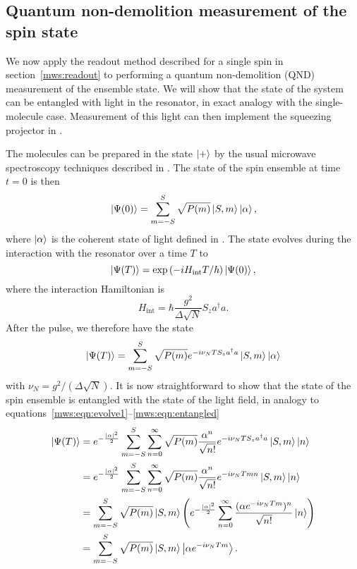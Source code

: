 \subsection{Quantum non-demolition measurement of the spin state}

We now apply the readout method described for a single spin in
section~\ref{mws:readout} to performing a quantum non-demolition (QND)
measurement of the ensemble state.
%
We will show that the state of the system can be entangled with light in the
resonator, in exact analogy with the single-molecule case. Measurement of this
light can then implement the squeezing projector in
.

The molecules can be prepared in the state $\ket{+}$ by the usual microwave
spectroscopy techniques described in . The
state of the spin ensemble at time $t=0$ is then
%
\begin{equation}
  \ket{\Psi(0)} = \sum_{m=-S}^S \sqrt{P(m)} \ket{S, m}\ket{\alpha},
\end{equation}
%
where $\ket{\alpha}$ is the coherent state of light defined in
. The state evolves during the interaction with the
resonator over a time $T$ to
%
\begin{equation}
  \ket{\Psi(T)} = \exp\left(-iH_\text{int}T/\hbar\right)\ket{\Psi(0)},
\end{equation}
%
where the interaction Hamiltonian is
%
\begin{equation}
  H_\text{int} = \hbar \frac{g^2}{\Delta\sqrt{N}} S_z a^\dagger a.
\end{equation}
%
After the pulse, we therefore have the state
%
\begin{equation}
  \ket{\Psi(T)} = \sum_{m=-S}^S \sqrt{P(m)} e^{-i\nu_N T S_z
  a^\dagger a} \ket{S, m}\ket{\alpha}
\end{equation}
%
with $\nu_N = g^2/(\Delta\sqrt{N})$. It is now straightforward to show that
the state of the spin ensemble is entangled with the state of the light field,
in analogy to equations~\ref{mws:eqn:evolve1}--\ref{mws:eqn:entangled}
%
\begin{align}
  \ket{\Psi(T)} &= e^{-\frac{|\alpha|^2}{2}}\sum_{m=-S}^S \sum_{n=0}^\infty \sqrt{P(m)}
   \frac{\alpha^n}{\sqrt{n!}} e^{-i\nu_N T S_z a^\dagger a} \ket{S, m} \ket{n}
   \\
  &= e^{-\frac{|\alpha|^2}{2}}\sum_{m=-S}^S \sum_{n=0}^\infty \sqrt{P(m)}
  \frac{\alpha^n}{\sqrt{n!}} e^{-i\nu_N Tm n} \ket{S, m} \ket{n} \\
  &= \sum_{m=-S}^S \sqrt{P(m)} \ket{S, m} \left( e^{-\frac{|\alpha|^2}{2}}
  \sum_{n=0}^\infty \frac{(\alpha e^{-i\nu_N T m})^n}{\sqrt{n!}}\ket{n}\right)
  \\
  &= \sum_{m=-S}^S \sqrt{P(m)} \ket{S, m}\ket{\alpha e^{-i\nu_N T m}}.
\end{align}

